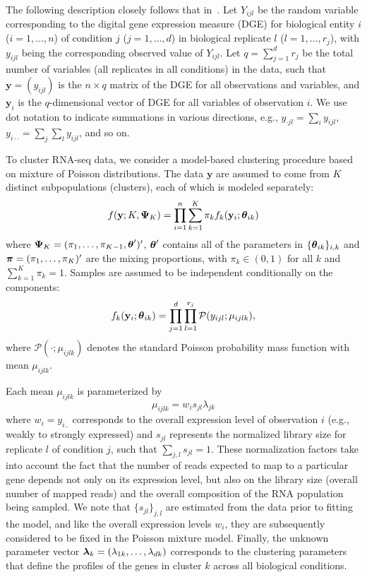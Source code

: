 \documentclass[10pt,oneside]{article}
\newcommand\bfm[1]{\ensuremath\boldsymbol{#1}}
\newcommand\y{\mathbf{y}}
\newcommand\Pois{\mathcal{P}}
\newcommand\PSI{\bfm{\Psi}}
\newcommand\LAMBDA{\bfm{\lambda}}
\newcommand\PI{\bfm{\pi}}
\begin{document}
The following description closely follows that in~\citep{Rau2014}.
Let $Y_{ijl}$ be the random variable corresponding to the digital gene expression measure (DGE) for biological entity $i$ ($i = 1,\ldots, n$) of condition $j$ ($j = 1,\ldots,d$) in biological replicate $l$ ($l = 1,\ldots,r_j$), with $y_{ijl}$ being the corresponding observed value of $Y_{ijl}$. Let $q=\sum_{j=1}^d r_j$ be the total number of variables (all replicates in all conditions) in the data, such that $\y = (y_{ijl})$ is the $n\times q$ matrix of the DGE for all observations and variables, and $\y_i$ is the $q$-dimensional vector of DGE for all variables of observation $i$.
We use dot notation to indicate summations in various directions, e.g., $y_{\cdot jl} = \sum_{i}y_{ijl}$, $y_{i \cdot\cdot} = \sum_{j}\sum_{l} y_{ijl}$, and so on.

To cluster RNA-seq data, we consider a model-based clustering procedure based on mixture of Poisson distributions.
The data $\y$ are assumed to come from $K$ distinct subpopulations (clusters), each of which is modeled separately:
\begin{equation}
f(\y;K,\PSI_K)
= \prod_{i=1}^n \sum_{k=1}^K \pi_k f_k(\y_i;\bfm{\theta}_{ik}) \nonumber
\end{equation}
where $\PSI_K = ( \pi_1,\ldots,\pi_{K-1}, \bfm{\theta}^\prime )^\prime$, $\bfm{\theta}^\prime$ contains all of the parameters in $\{\bfm{\theta}_{ik}\}_{i,k}$ and
$\PI = (\pi_1,\ldots,\pi_K)^\prime$ are the mixing proportions, with $\pi_k \in (0,1)$ for all $k$ and $\sum_{k=1}^K \pi_k = 1$. Samples are assumed to be independent conditionally on the components:
\begin{equation}
f_k(\y_i;\bfm{\theta}_{ik})=\prod_{j=1}^d \prod_{l=1}^{r_j} \Pois(y_{ijl};\mu_{ijlk}), \nonumber
\end{equation}
where $\Pois(\cdot;\mu_{ijlk})$ denotes the standard Poisson probability mass function with mean $\mu_{ijlk}$.

Each mean $\mu_{ijlk}$ is parameterized by
\begin{equation}
\mu_{ijlk} = w_i s_{jl} \lambda_{jk} \nonumber
\end{equation}
where $w_i = y_{i..}$ corresponds to the overall expression level of observation $i$ (e.g., weakly to strongly expressed)
and $s_{jl}$ represents the normalized library size for replicate $l$ of condition $j$, such that $\sum_{j,l} s_{jl} = 1$. These normalization factors take into account the fact that the number of reads expected to map to a particular gene depends not only on its expression level, but also on the library size (overall number of mapped reads) and the overall composition of the RNA population being sampled. We note that $\{s_{jl}\}_{j,l}$ are estimated from the data prior to fitting the model, and like the overall expression levels $w_i$, they are subsequently considered to be fixed in the Poisson mixture model. Finally, the unknown parameter vector $\LAMBDA_{k} = (\lambda_{1k},\ldots,\lambda_{dk})$ corresponds to the clustering parameters that define the profiles of the genes in cluster $k$ across all biological conditions.
\end{document}
